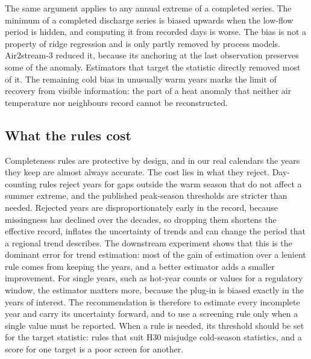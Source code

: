 \documentclass[draft]{agujournal2025}
\begin{document}
The same argument applies to any annual extreme of a completed series. The minimum of a completed discharge series is biased upwards when the low-flow period is hidden, and computing it from recorded days is worse. The bias is not a property of ridge regression and is only partly removed by process models. Air2stream-3 reduced it, because its anchoring at the last observation preserves some of the anomaly. Estimators that target the statistic directly removed most of it. The remaining cold bias in unusually warm years marks the limit of recovery from visible information: the part of a heat anomaly that neither air temperature nor neighbours record cannot be reconstructed.

\subsection{What the rules cost}
Completeness rules are protective by design, and in our real calendars the years they keep are almost always accurate. The cost lies in what they reject. Day-counting rules reject years for gaps outside the warm season that do not affect a summer extreme, and the published peak-season thresholds are stricter than needed. Rejected years are disproportionately early in the record, because missingness has declined over the decades, so dropping them shortens the effective record, inflates the uncertainty of trends and can change the period that a regional trend describes. The downstream experiment shows that this is the dominant error for trend estimation: most of the gain of estimation over a lenient rule comes from keeping the years, and a better estimator adds a smaller improvement. For single years, such as hot-year counts or values for a regulatory window, the estimator matters more, because the plug-in is biased exactly in the years of interest. The recommendation is therefore to estimate every incomplete year and carry its uncertainty forward, and to use a screening rule only when a single value must be reported. When a rule is needed, its threshold should be set for the target statistic: rules that suit H30 misjudge cold-season statistics, and a score for one target is a poor screen for another.
\end{document}
